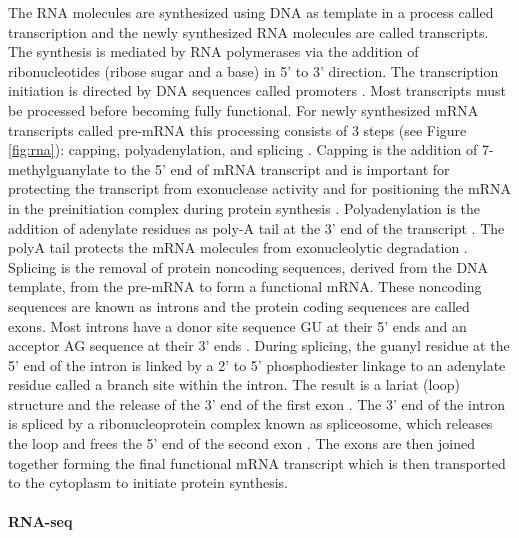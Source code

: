 The RNA molecules are synthesized using DNA as template in a process called transcription and the newly synthesized RNA molecules are called transcripts. The synthesis is mediated by RNA polymerases via the addition of ribonucleotides (ribose sugar and a base) in 5' to 3' direction. The transcription initiation is directed by DNA sequences called promoters \citep{Haberle2018}. Most transcripts must be processed before becoming fully functional. For newly synthesized mRNA transcripts called pre-mRNA this processing consists of 3 steps (see Figure \ref{fig:rna}): capping, polyadenylation, and splicing \citep{AlbertsB2002MolecularEdition}. Capping is the addition of 7-methylguanylate to the 5' end of mRNA transcript and is important for protecting the transcript from exonuclease activity and for positioning the mRNA in the preinitiation complex during protein synthesis \citep{Darnell1979,Shatkin1976,Filipowicz1976}. Polyadenylation is the addition of adenylate residues as poly-A tail at the 3' end of the transcript \citep{Wahle1999}. The polyA tail protects the mRNA molecules from exonucleolytic degradation \citep{Wu2012}. Splicing is the removal of protein noncoding sequences, derived from the DNA template, from the pre-mRNA to form a functional mRNA. These noncoding sequences are known as introns and the protein coding sequences are called exons. Most introns have a donor site sequence GU at their 5' ends and an acceptor AG sequence at their 3' ends \citep{Moore1993}. During splicing, the guanyl residue at the 5' end of the intron is linked by a 2' to 5' phosphodiester linkage to an adenylate residue called a branch site within the intron. The result is a lariat (loop) structure and the release of the 3' end of the first exon \citep{Wachtel2009}. The 3' end of the intron is spliced by a ribonucleoprotein complex known as spliceosome, which releases the loop and frees the 5' end of the second exon \citep{doi:10.1146/annurev.bi.65.070196.002055}. The exons are then joined together forming the final functional mRNA transcript which is then transported to the cytoplasm to initiate protein synthesis.

\paragraph{RNA-seq}

